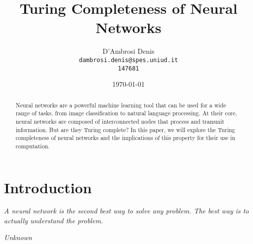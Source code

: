 \documentclass{article}
\title{Turing Completeness of Neural Networks}
\author{D'Ambrosi Denis \\ \small \texttt{dambrosi.denis@spes.uniud.it} \\ \small \texttt{147681}}
\date{\today}
\begin{document}
\maketitle

\begin{abstract}
    Neural networks are a powerful machine learning tool that can be
    used for a wide range of tasks, from image classification to natural
    language processing. At their core, neural networks are composed
    of interconnected nodes that process and transmit information. But
    are they Turing complete? In this paper, we will explore the Turing
    completeness of neural networks and the implications of this
    property for their use in computation.
\end{abstract}

\section{Introduction}

\epigraph{\textit{A neural network is the second best way to solve any problem. The best way is to actually understand the problem.}}{\textit{Unknown}}

\end{document}
